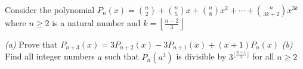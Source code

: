 Consider the polynomial
$P_n(x) = \binom {n}{2}+\binom {n}{5}x+\binom {n}{8}x^2 + \cdots + \binom {n}{3k+2}x^{3k}$
where $n \ge 2$ is a natural number and $k = \left\lfloor \frac{n-2}{3} \right \rfloor$


\textit{(a)} Prove that $P_{n+3}(x)=3P_{n+2}(x)-3P_{n+1}(x)+(x+1)P_n(x)$
\textit{(b)} Find all integer numbers $a$ such that $P_n(a^3)$ is divisible by $3^{ \lfloor \frac{n-1}{2} \rfloor}$ for all $n \ge 2$